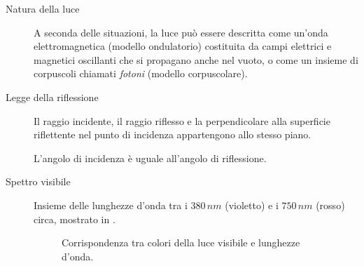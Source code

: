 \documentclass[a4paper,11pt,italian]{article}
\begin{document}
\begin{description}
  \item[Natura della luce] 
  A seconda delle situazioni, la luce può essere descritta come un'onda elettromagnetica (modello ondulatorio) costituita da campi elettrici e magnetici oscillanti che si propagano anche nel vuoto, o come un insieme di corpuscoli chiamati \emph{fotoni} (modello corpuscolare).
  
  \item[Legge della riflessione] 
  Il raggio incidente, il raggio riflesso e la perpendicolare alla superficie riflettente nel punto di incidenza appartengono allo stesso piano.
  
  L'angolo di incidenza è uguale all'angolo di riflessione.
  
%   
%   
  
  \item[Spettro visibile] 
  Insieme delle lunghezze d'onda tra i $ 380 \, nm $ (violetto) e i $ 750 \, nm $ (rosso) circa, mostrato in .
  
  \begin{figure}[htb]\centering
    \pgfspectra[axis,axis step=30,end=750]
    \caption{Corrispondenza tra colori della luce visibile e lunghezze d'onda.}
    \label{img:spettrovisibile}
  \end{figure}
  

\end{description}
\end{document}
